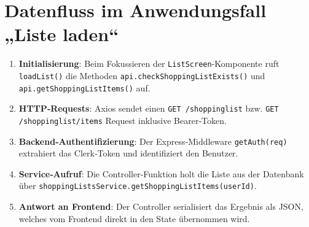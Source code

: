 \section{Datenfluss im Anwendungsfall „Liste laden“}
\begin{enumerate}
\item \textbf{Initialisierung}: Beim Fokussieren der \texttt{ListScreen}-Komponente ruft \texttt{loadList()} die Methoden \texttt{api.checkShoppingListExists()} und \texttt{api.getShoppingListItems()} auf.
\item \textbf{HTTP‑Requests}: Axios sendet einen \texttt{GET /shoppinglist} bzw. \texttt{GET /shoppinglist/items} Request inklusive Bearer‑Token.
\item \textbf{Backend‑Authentifizierung}: Der Express‑Middleware \texttt{getAuth(req)} extrahiert das Clerk‑Token und identifiziert den Benutzer.
\item \textbf{Service‑Aufruf}: Die Controller‑Funktion holt die Liste aus der Datenbank über \texttt{shoppingListsService.getShoppingListItems(userId)}.
\item \textbf{Antwort an Frontend}: Der Controller serialisiert das Ergebnis als JSON, welches vom Frontend direkt in den State übernommen wird.
\end{enumerate}
